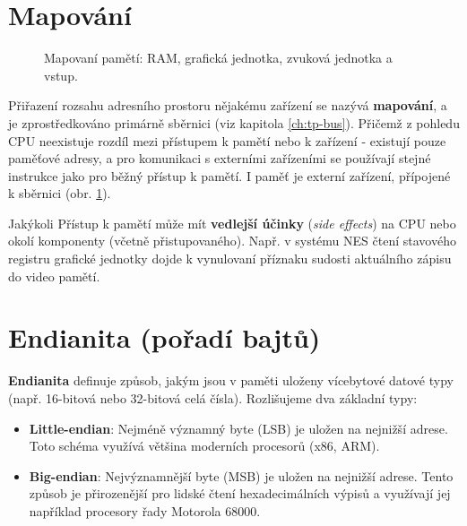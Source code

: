 \section{Mapování}

\begin{figure}[H]
    \centering
    
    \caption{Mapovaní pamětí: RAM, grafická jednotka, zvuková jednotka a vstup.}
    \label{fig:memory_map}
\end{figure}

Přiřazení rozsahu adresního prostoru nějakému zařízení se nazývá \textbf{mapování}, a je
zprostředkováno primárně sběrnici (viz kapitola \ref{ch:tp-bus}). Přičemž z pohledu CPU neexistuje
rozdíl mezi přístupem k pamětí nebo k zařízení - existují pouze paměťové adresy, a pro komunikaci
s externími zařízeními se používají stejné instrukce jako pro běžný přístup k pamětí. I paměť je
externí zařízení, přípojené k sběrnici (obr. \ref{fig:memory_map}).

Jakýkoli Přístup k pamětí může mít \textbf{vedlejší účinky} (\textit{side effects}) na CPU nebo
okolí komponenty (včetně přistupovaného). Např. v systému NES čtení stavového registru grafické
jednotky dojde k vynulovaní příznaku sudosti aktuálního zápisu do video pamětí.

\section{Endianita (pořadí bajtů)}

\textbf{Endianita} definuje způsob, jakým jsou v paměti uloženy vícebytové datové typy (např.
16-bitová nebo 32-bitová celá čísla). Rozlišujeme dva základní typy:

\begin{itemize}
    \item \textbf{Little-endian}: Nejméně významný byte (LSB) je uložen na nejnižší adrese. Toto
        schéma využívá většina moderních procesorů (x86, ARM).
    \item \textbf{Big-endian}: Nejvýznamnější byte (MSB) je uložen na nejnižší adrese. Tento způsob
        je přirozenější pro lidské čtení hexadecimálních výpisů a využívají jej například procesory
        řady Motorola 68000.
\end{itemize}
